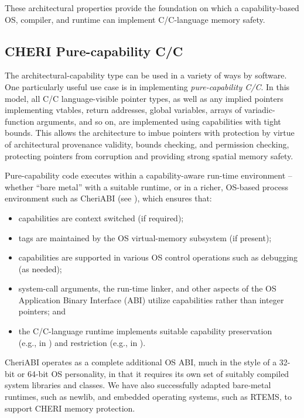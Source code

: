 \documentclass[12pt,twoside,openright,usletter]{article}
\newcommand{\ccode}[1]{{\small\ttfamily{#1}}}
\newcommand{\cfunc}[1]{{\ccode{#1()}}}
\newcommand{\note}[2]{{\color{blue}[ Note: #1 - #2]}}
\renewcommand{\note}[2]{\relax\ifhmode\unskip\fi}
\newcommand{\psnote}[1]{\note{#1}{Peter S.}}
\newcommand*{\cpp}[1][]{C\textsmaller[2]{\nolinebreak[4]\hspace{-.05em}\raisebox{.45ex}{\textbf{++}}}}
\newcommand*{\cppInHeader}[1][]{\texorpdfstring{\cpp{}}{C++}}
\begin{document}
These architectural properties provide the foundation on which a
capability-based OS, compiler, and runtime can implement C/\cpp{}-language memory
safety.

\psnote{Add:   They have been made precise and have been proved, with machine-checked proof, to hold for the CHERI-MIPS architecture~\cite{cheri-formal-SP2020}.}


\subsection{CHERI Pure-capability C/\cppInHeader{}}

The architectural-capability type can be used in a variety of ways by
software.
One particularly useful use case is in implementing \textit{pure-capability
C/\cpp{}}.
In this model, all C/\cpp{} language-visible pointer types, as well as any
implied pointers implementing vtables, return addresses, global variables,
arrays of variadic-function arguments, and so on, are implemented using
capabilities with tight bounds.
This allows the architecture to imbue pointers with protection by virtue of
architectural provenance validity, bounds checking, and permission checking,
protecting pointers from corruption and providing strong spatial memory
safety.

Pure-capability code executes within a capability-aware run-time environment
-- whether ``bare metal'' with a suitable runtime, or in a richer, OS-based
process environment such as CheriABI (see ),
which ensures that:
\begin{itemize}
  \item capabilities are context switched (if required);
  \item tags are maintained by the OS virtual-memory subsystem (if present);
  \item capabilities are supported in various OS control operations such as
    debugging (as needed);
  \item system-call arguments, the
run-time linker, and other aspects of the OS Application Binary Interface
(ABI) utilize capabilities rather than integer pointers; and
  \item the C/\cpp{}-language runtime implements suitable capability preservation
    \\
    (e.g., in \cfunc{memcpy}) and restriction (e.g., in \cfunc{malloc}).
\end{itemize}
CheriABI operates as a complete additional OS ABI, much in the style of a
32-bit or 64-bit OS personality, in that it requires its own set of suitably
compiled system libraries and classes.
We have also successfully adapted bare-metal runtimes, such as newlib, and
embedded operating systems, such as RTEMS, to support CHERI memory protection.
\end{document}
